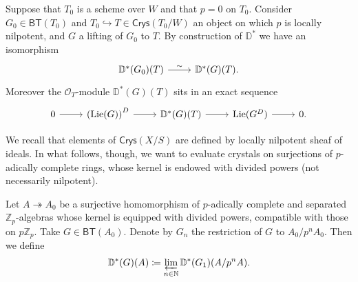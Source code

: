 \begin{rem}[]\label{rem:DGValuationRestriction}
	Suppose that $T_0$ is a scheme over $W$ and that $p = 0$ on $T_0$.
	Consider $G_0 \in \mathsf{BT}(T_0)$ and $T_0 \hookrightarrow T \in \mathsf{Crys}(T_0/W)$
	an object on which $p$ is locally nilpotent, and $G$ a lifting of $G_0$ to $T$.
	By construction of $\mathbb{D}^*$ we have an isomorphism
	\begin{equation*}
	\begin{tikzcd}[row sep = 0ex
		,/tikz/column 1/.append style={anchor=base east}
		,/tikz/column 2/.append style={anchor=base west}]
		\mathbb{D}^*(G_0)(T) \arrow[r, "\sim", rightarrow] &
		\mathbb{D}^*(G)(T)
	.\end{tikzcd}
	\end{equation*} 
	Moreover the $\mathcal{O}_{ T }$-module $\mathbb{D}^*(G)(T)$ sits in an exact sequence
	\begin{equation*}
	\begin{tikzcd}
		0 \arrow[r, "", rightarrow] &
		\left( \mathrm{Lie}(G) \right)^D \arrow[r, "", rightarrow] &
		\mathbb{D}^*(G)(T) \arrow[r, "", rightarrow] &
		\mathrm{Lie}(G^D) \arrow[r, "", rightarrow] &
		0
	.\end{tikzcd}
	\end{equation*}
\end{rem}


\noindent
We recall that elements of $\mathsf{Crys}(X/S)$ are defined by
locally nilpotent sheaf of ideals.
In what follows, though, we want to evaluate crystals on
surjections of $p$-adically complete rings, whose kernel is endowed with divided powers
(not necessarily nilpotent).
\begin{defn}[]\label{defn:NotNilpotentEvaluation}
	Let $A \twoheadrightarrow A_0$ be a surjective homomorphism
	of $p$-adically complete and separated $\mathbb{Z}_{p}$-algebras
	whose kernel is equipped with divided powers, compatible with those on $p \mathbb{Z}_{p}$.
	Take $G \in \mathsf{BT}(A_0)$.
	Denote by $G_n$ the restriction of $G$ to $A_0/p^nA_0$.
	Then we define
	\begin{equation*}
		\mathbb{D}^*(G)(A) \coloneqq
		\varprojlim_{n \in \mathbb{N}} \mathbb{D}^*(G_1)(A/p^nA)
	.\end{equation*}
\end{defn}


